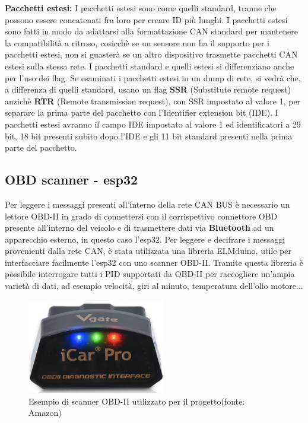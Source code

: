 \documentclass[12pt, a4paper, italian]{report}
\numberwithin{figure}{chapter}
\numberwithin{table}{chapter}
\begin{document}
\textbf{Pacchetti estesi:}
I pacchetti estesi sono come quelli standard, tranne che possono essere concatenati fra loro per creare ID più lunghi. I pacchetti estesi sono fatti in modo da adattarsi alla formattazione CAN standard per mantenere la compatibilità a ritroso, cosicchè se un sensore non ha il supporto per i pacchetti estesi, non si guasterà se un altro dispositivo trasmette pacchetti CAN estesi sulla stessa rete. I pacchetti standard e quelli estesi si differenziano anche per l'uso dei flag. Se esaminati i pacchetti estesi in un dump di rete, si vedrà che, a differenza di quelli standard, usano un flag \textbf{SSR} (Substitute remote request) anzichè \textbf{RTR} (Remote transmission request), con SSR impostato al valore 1, per separare la prima parte del pacchetto con l'Identifier extension bit (IDE). I pacchetti estesi avranno il campo IDE impostato al valore 1 ed identificatori a 29 bit, 18 bit presenti subito dopo l'IDE e gli 11 bit standard presenti nella prima parte del pacchetto.

\subsection{OBD scanner - esp32}
\label{sec:capitolo432}
Per leggere i messaggi presenti all'interno della rete CAN BUS è necessario un lettore OBD-II in grado di connettersi con il corrispettivo connettore OBD presente all'interno del veicolo e di trasmettere dati via \textbf{Bluetooth} ad un apparecchio esterno, in questo caso l'esp32. Per leggere e decifrare i messaggi provenienti dalla rete CAN, è stata utilizzata una libreria ELMduino, utile per interfacciare facilmente l'esp32 con uno scanner OBD-II. Tramite questa libreria è possibile interrogare tutti i PID supportati da OBD-II per raccogliere un'ampia varietà di dati, ad esempio velocità, giri al minuto, temperatura dell'olio motore...

\begin{figure}[h]
  \centering
  \includegraphics[width=6cm]{LettoreScannerOBD-II.png}
  \caption{Esempio di scanner OBD-II utilizzato per il progetto\protect\footnotemark (fonte: Amazon)}
  \label{fig:scannerOBD-II}
\end{figure}
\end{document}
